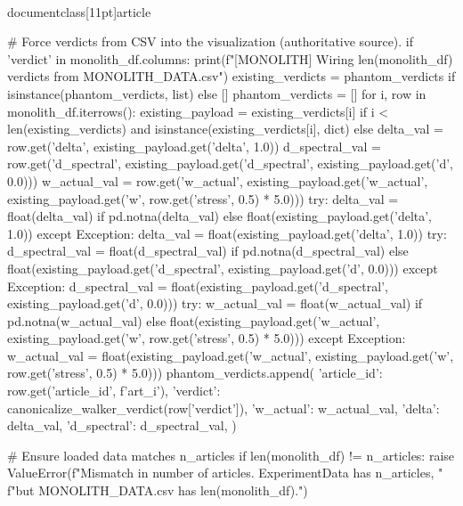 \\documentclass[11pt]{article}
\begin{document}
\begin{CodeBlock}
{{{{{        # Force verdicts from CSV into the visualization (authoritative source).
        if 'verdict' in monolith_df.columns:
            print(f"[MONOLITH] Wiring {len(monolith_df)} verdicts from MONOLITH_DATA.csv")
            existing_verdicts = phantom_verdicts if isinstance(phantom_verdicts, list) else []
            phantom_verdicts = []
            for i, row in monolith_df.iterrows():
                existing_payload = existing_verdicts[i] if i < len(existing_verdicts) and isinstance(existing_verdicts[i], dict) else {}
                delta_val = row.get('delta', existing_payload.get('delta', 1.0))
                d_spectral_val = row.get('d_spectral', existing_payload.get('d_spectral', existing_payload.get('d', 0.0)))
                w_actual_val = row.get('w_actual', existing_payload.get('w_actual', existing_payload.get('w', row.get('stress', 0.5) * 5.0)))
                try:
                    delta_val = float(delta_val) if pd.notna(delta_val) else float(existing_payload.get('delta', 1.0))
                except Exception:
                    delta_val = float(existing_payload.get('delta', 1.0))
                try:
                    d_spectral_val = float(d_spectral_val) if pd.notna(d_spectral_val) else float(existing_payload.get('d_spectral', existing_payload.get('d', 0.0)))
                except Exception:
                    d_spectral_val = float(existing_payload.get('d_spectral', existing_payload.get('d', 0.0)))
                try:
                    w_actual_val = float(w_actual_val) if pd.notna(w_actual_val) else float(existing_payload.get('w_actual', existing_payload.get('w', row.get('stress', 0.5) * 5.0)))
                except Exception:
                    w_actual_val = float(existing_payload.get('w_actual', existing_payload.get('w', row.get('stress', 0.5) * 5.0)))
                phantom_verdicts.append({
                    'article_id': row.get('article_id', f'art_{i}'),
                    'verdict': canonicalize_walker_verdict(row['verdict']),
                    'w_actual': w_actual_val,
                    'delta': delta_val,
                    'd_spectral': d_spectral_val,
                })

        # Ensure loaded data matches n_articles
        if len(monolith_df) != n_articles:
            raise ValueError(f"Mismatch in number of articles. ExperimentData has {n_articles}, "
                             f"but MONOLITH_DATA.csv has {len(monolith_df)}.")

}}}}}
\end{CodeBlock}
\end{document}
